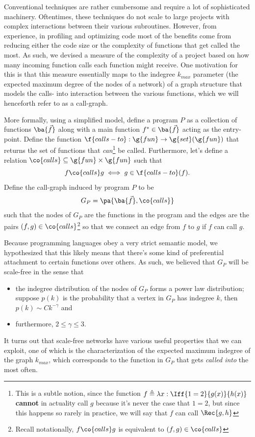 \documentclass[11pt,a4paper]{article}
\begin{document}
Conventional techniques are rather cumbersome and require a lot of 
sophisticated machinery. Oftentimes, these techniques do not scale to large 
projects with complex interactions between their various subroutines. However, 
from experience, in profiling and optimizing code most of the 
benefits come from reducing either the code size or the complexity of 
functions that get called the most. As such, we devised a measure of the 
complexity of a project based on how many incoming function calls each 
function might receive. One motivation for this is that this measure 
essentially maps to the indegree $k_{max}$ parameter (the expected maximum 
degree of the nodes of a network) of a graph structure that models the calls-
into interaction between the various functions, which we will henceforth
refer to as a call-graph.

More formally, using a simplified model,  define a program $P$ as a 
collection of functions $\ba{\vec f}$ along with a main function 
$f^* \in \ba{\vec f}$ acting as the entry-point. Define the function 
$\f{calls-to}: \g{fun} \to \g{set}(\g{fun})$ that returns the set of functions 
that \textit{can}\footnote{This is a subtle notion, since the 
function $f \triangleq \lambda x: \Iff{1 = 2}{g(x)}{h(x)}$ \textbf{cannot} in 
actuality call $g$ because it's never the case that $1 = 2$, but since this 
happens so rarely in practice, we will say that $f$ can call $\Rec{g,h}$} be 
called. Furthermore, let's define a relation 
$\co{calls} \subseteq \g{fun} \times \g{fun}$ such that 
$$f \co{calls} g \iff g \in \f{calls-to}(f).$$
Define the call-graph induced by program $P$ to be 
$$G_P = \pa{\ba{\vec f}, \co{calls}}$$
such that the nodes of $G_P$ are the functions in the program and the edges 
are the pairs $(f,g) \in \co{calls}$\footnote{Recall notationally, 
$f\co{calls}g$ is equivalent to $(f,g) \in \co{calls}$} so that we connect an 
edge from $f$ to $g$ if $f$ can call $g$.

Because programming languages obey a very strict semantic model, we 
hypothesized that this likely means that there's some kind of preferential 
attachment to certain functions over others. As such, we believed that $G_P$ 
will be scale-free in the sense that\cite{DUR}
\begin{itemize}
\item the indegree distribution of the nodes of $G_P$ forms a power law 
distribution; suppose $p(k)$ is the probability that a vertex in $G_P$ has 
indegree $k$, then $p(k) \sim C k^{-\gamma}$ and
\item furthermore, $2 \le \gamma \le 3$.
\end{itemize}
It turns out that scale-free networks have various useful properties that we 
can exploit, one of which is the characterization of the expected maximum 
indegree of the graph $k_{max}$, which corresponds to the function in $G_P$ 
that gets \emph{called into} the most often. 
\end{document}
